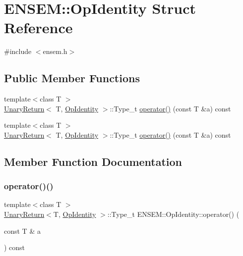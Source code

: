\hypertarget{structENSEM_1_1OpIdentity}{}\section{E\+N\+S\+EM\+:\+:Op\+Identity Struct Reference}
\label{structENSEM_1_1OpIdentity}


{\ttfamily \#include $<$ensem.\+h$>$}

\subsection*{Public Member Functions}
\begin{DoxyCompactItemize}
\item 
{\footnotesize template$<$class T $>$ }\\\mbox{\hyperlink{structENSEM_1_1UnaryReturn}{Unary\+Return}}$<$ T, \mbox{\hyperlink{structENSEM_1_1OpIdentity}{Op\+Identity}} $>$\+::Type\+\_\+t \mbox{\hyperlink{structENSEM_1_1OpIdentity_a4ff09949750390fcf0e8f6a85b20a1ec}{operator()}} (const T \&a) const
\item 
{\footnotesize template$<$class T $>$ }\\\mbox{\hyperlink{structENSEM_1_1UnaryReturn}{Unary\+Return}}$<$ T, \mbox{\hyperlink{structENSEM_1_1OpIdentity}{Op\+Identity}} $>$\+::Type\+\_\+t \mbox{\hyperlink{structENSEM_1_1OpIdentity_a4ff09949750390fcf0e8f6a85b20a1ec}{operator()}} (const T \&a) const
\end{DoxyCompactItemize}


\subsection{Member Function Documentation}
\mbox{\label{structENSEM_1_1OpIdentity_a4ff09949750390fcf0e8f6a85b20a1ec}} 
\subsubsection{\texorpdfstring{operator()()}{operator()()}\hspace{0.1cm}{\footnotesize\ttfamily [1/2]}}
{\footnotesize\ttfamily template$<$class T $>$ \\
\mbox{\hyperlink{structENSEM_1_1UnaryReturn}{Unary\+Return}}$<$T, \mbox{\hyperlink{structENSEM_1_1OpIdentity}{Op\+Identity}} $>$\+::Type\+\_\+t E\+N\+S\+E\+M\+::\+Op\+Identity\+::operator() (\begin{DoxyParamCaption}\item[{const T \&}]{a }\end{DoxyParamCaption}) const\hspace{0.3cm}{\ttfamily [inline]}}

